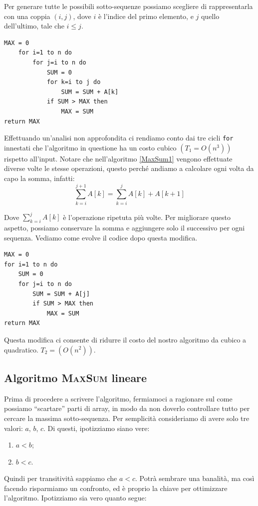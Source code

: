 Per generare tutte le possibili sotto-sequenze possiamo scegliere di rappresentarla con una coppia $(i, j)$, dove $i$ è l'indice del primo elemento, e $j$ quello dell'ultimo, tale che $i\leq j$.


\begin{lstlisting}[label = MaxSum1, language=asd, caption={MaxSum1(A,n)}]
MAX = 0
    for i=1 to n do
        for j=i to n do
            SUM = 0
            for k=i to j do
                SUM = SUM + A[k]
            if SUM > MAX then
                MAX = SUM
return MAX
\end{lstlisting}

Effettuando un'analisi non approfondita ci rendiamo conto dai tre cicli \texttt{for} innestati che l'algoritmo in questione ha un costo cubico $(T_1 = O(n^3))$ rispetto all'input. Notare che nell'algoritmo \ref{MaxSum1} vengono effettuate diverse volte le stesse operazioni, questo perché andiamo a calcolare ogni volta da capo la somma, infatti:
\begin{equation}
    \sum_{k=i}^{j+1} A[k] = \sum_{k=i}^{j} A[k] + A[k+1]
\end{equation}

Dove $\displaystyle\sum_{k=i}^{j} A[k]$ è l'operazione ripetuta più volte. Per migliorare questo aspetto, possiamo conservare la somma e aggiungere solo il successivo per ogni sequenza. Vediamo come evolve il codice dopo questa modifica.

\begin{lstlisting}[label = MaxSum2, language=asd, caption={MaxSum2(A,n)}]
MAX = 0
for i=1 to n do
    SUM = 0
    for j=i to n do
        SUM = SUM + A[j]
        if SUM > MAX then
            MAX = SUM
return MAX
\end{lstlisting}

Questa modifica ci consente di ridurre il costo del nostro algoritmo da cubico a quadratico. $T_2 = (O(n^2))$.

\subsection{Algoritmo \textsc{MaxSum} lineare}

Prima di procedere a scrivere l'algoritmo, fermiamoci a ragionare sul come possiamo ``scartare'' parti di array, in modo da non doverlo controllare tutto per cercare la massima sotto-sequenza. Per semplicità consideriamo di avere solo tre valori: $a$, $b$, $c$. Di questi, ipotizziamo siano vere:
\begin{enumerate}
    \item $a<b$;
    \item $b<c$.
\end{enumerate}
Quindi per transitività sappiamo che $a<c$. Potrà sembrare una banalità, ma così facendo risparmiamo un confronto, ed è proprio la chiave per ottimizzare l'algoritmo. Ipotizziamo sia vero quanto segue:

